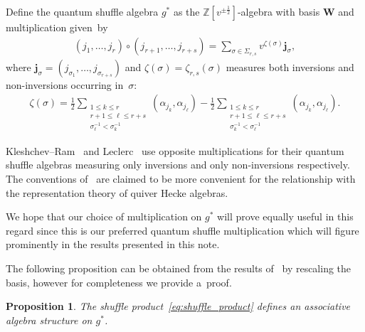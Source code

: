 \documentclass[pdftex]{sigma}
\numberwithin{equation}{section}
\newtheorem{Proposition}[Theorem]{Proposition}
{ \theoremstyle{definition}
\newtheorem{Definition}[Theorem]{Definition}
\newtheorem{Example}[Theorem]{Example}
\newtheorem{Remark}[Theorem]{Remark}
}
\begin{document}
Def\/ine the quantum shuf\/f\/le algebra $g^*$ as the $\mathbb{Z}[v^{\pm\frac{1}{2}}]$-algebra with basis $\mathbf{W}$ and
multiplication given~by
\begin{gather}
\label{eq:shuffle_product}
(j_1,\ldots,j_r)\circ(j_{r+1},\ldots,j_{r+s})=\sum\limits_{\sigma\in\Sigma_{r,s}}v^{\zeta(\sigma)}\mathbf{j}_\sigma,
\end{gather}
where $\mathbf{j}_\sigma=(j_{\sigma_1},\ldots,j_{\sigma_{r+s}})$ and $\zeta(\sigma)=\zeta_{r,s}(\sigma)$ measures both
inversions and non-inversions occurring in~$\sigma$:
\begin{gather*}
\zeta(\sigma)=\frac{1}{2}\sum\limits_{\substack{1\le k\le r
\\
r+1\le \ell\le r+s
\\
\sigma^{-1}_\ell<\sigma^{-1}_k}}(\alpha_{j_k},\alpha_{j_\ell})-\frac{1}{2}\sum\limits_{\substack{1\le k\le r
\\
r+1\le \ell\le r+s
\\
\sigma^{-1}_k<\sigma^{-1}_\ell}}(\alpha_{j_k},\alpha_{j_\ell}).
\end{gather*}

\begin{Remark}
Kleshchev--Ram~\cite{kleshchev-ram1} and Leclerc~\cite{leclerc} use opposite multiplications for their quantum shuf\/f\/le
algebras measuring only inversions and only non-inversions respectively.
The conventions of~\cite{kleshchev-ram1} are claimed to be more convenient for the relationship with the representation
theory of quiver Hecke algebras.

We hope that our choice of multiplication on $g^*$ will prove equally useful in this regard since this is our preferred
quantum shuf\/f\/le multiplication which will f\/igure prominently in the results presented in this note.
\end{Remark}

The following proposition can be obtained from the results of~\cite{leclerc} by rescaling the basis, however for
completeness we provide a~proof.

\begin{Proposition}%
The shuffle product~\eqref{eq:shuffle_product} defines an associative algebra structure on $g^*$.
\end{Proposition}
\end{document}
